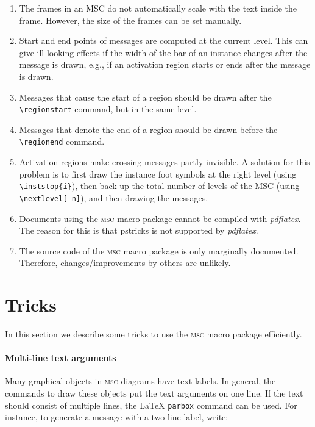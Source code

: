 \documentclass[a4paper]{article}
\newcommand{\cmd}[1]{\texttt{\bslash #1}}
\newcommand{\acro}[1]{{\scshape\lowercase{#1}}}
\newcommand\MSC{\acro{MSC}}
\newcommand{\mscpack}{\MSC{} macro package}
\begin{document}
\begin{enumerate}

\item The frames in an MSC do not automatically scale with the text
inside the frame. However, the size of the frames can be set manually.

\item Start and end points of messages are computed at the current
level. This can give ill-looking effects if the width of the bar of an
instance changes after the message is drawn, e.g., if an activation
region starts or ends after the message is drawn.

\item Messages that cause the start of a region should be drawn after
the \verb|\regionstart| command, but in the same level.

\item Messages that denote the end of a region should be
drawn before the \verb|\regionend| command.

\item Activation regions make crossing messages partly invisible. A
solution for this problem is to first draw the instance foot symbols
at the right level (using \verb|\inststop{i}|), then back up the total
number of levels of the MSC (using \verb|\nextlevel[-n]|), and then
drawing the messages.


\item Documents using the \mscpack{} cannot be compiled with
\emph{pdflatex}. The reason for this is that \textsf{pstricks} is not
supported by \emph{pdflatex}.

\item The source code of the \mscpack{} is only marginally
documented. Therefore, changes/improvements by others are unlikely.

\end{enumerate}

\section{Tricks}
\label{sec:tricks}

In this section we describe some tricks to use the \mscpack{}
efficiently.

\paragraph{Multi-line text arguments}
Many graphical objects in \MSC{} diagrams have text labels. In general,
the commands to draw these objects put the text arguments on one
line. If the text should consist of multiple lines, the \LaTeX{}
\cmd{parbox} command can be used. For instance, to generate a message
with a two-line label, write:
\end{document}
